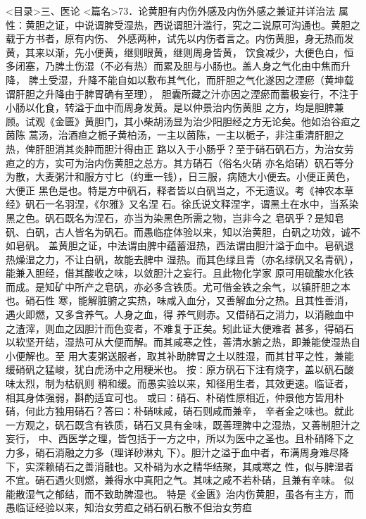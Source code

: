 \documentclass[a4paper,12pt,UTF8,twoside]{ctexbook}
\begin{document}
<目录>三、医论
<篇名>73．论黄胆有内伤外感及内伤外感之兼证并详治法
属性：黄胆之证，中说谓脾受湿热，西说谓胆汁滥行，究之二说原可沟通也。黄胆之载于方书者，原有内伤、 
外感两种，试先以内伤者言之。内伤黄胆，身无热而发黄，其来以渐，先小便黄，继则眼黄，继则周身皆黄， 
饮食减少，大便色白，恒多闭塞，乃脾土伤湿（不必有热）而累及胆与小肠也。盖人身之气化由中焦而升降， 
脾土受湿，升降不能自如以敷布其气化，而肝胆之气化遂因之湮瘀（黄坤载谓肝胆之升降由于脾胃确有至理）， 
胆囊所藏之汁亦因之湮瘀而蓄极妄行，不注于小肠以化食，转溢于血中而周身发黄。是以仲景治内伤黄胆 
之方，均是胆脾兼顾。试观《金匮》黄胆门，其小柴胡汤显为治少阳胆经之方无论矣。他如治谷疸之茵陈 
蒿汤，治酒疸之栀子黄柏汤，一主以茵陈，一主以栀子，非注重清肝胆之热，俾肝胆消其炎肿而胆汁得由正 
路以入于小肠乎？至于硝石矾石方，为治女劳疸之的方，实可为治内伤黄胆之总方。其方硝石（俗名火硝 
亦名焰硝）矾石等分为散，大麦粥汁和服方寸匕（约重一钱），日三服，病随大小便去。小便正黄色，大便正 
黑色是也。特是方中矾石，释者皆以白矾当之，不无遗议。考《神农本草经》矾石一名羽涅，《尔雅》又名涅 
石。徐氏说文释涅字，谓黑土在水中，当系染黑之色。矾石既名为涅石，亦当为染黑色所需之物，岂非今之 
皂矾乎？是知皂矾、白矾，古人皆名为矾石。而愚临症体验以来，知以治黄胆，白矾之功效，诚不如皂矾。 
盖黄胆之证，中法谓由脾中蕴蓄湿热，西法谓由胆汁溢于血中。皂矾退热燥湿之力，不让白矾，故能去脾中 
湿热。而其色绿且青（亦名绿矾又名青矾），能兼入胆经，借其酸收之味，以敛胆汁之妄行。且此物化学家 
原可用硫酸水化铁而成。是知矿中所产之皂矾，亦必多含铁质。尤可借金铁之余气，以镇肝胆之本也。硝石性 
寒，能解脏腑之实热，味咸入血分，又善解血分之热。且其性善消，遇火即燃，又多含养气。人身之血，得 
养气则赤。又借硝石之消力，以消融血中之渣滓，则血之因胆汁而色变者，不难复于正矣。矧此证大便难者 
甚多，得硝石以软坚开结，湿热可从大便而解。而其咸寒之性，善清水腑之热，即兼能使湿热自小便解也。至 
用大麦粥送服者，取其补助脾胃之土以胜湿，而其甘平之性，兼能缓硝矾之猛峻，犹白虎汤中之用粳米也。 
按∶原方矾石下注有烧字，盖以矾石酸味太烈，制为枯矾则 
稍和缓。而愚实验以来，知径用生者，其效更速。临证者，相其身体强弱，斟酌适宜可也。 
或曰∶硝石、朴硝性原相近，仲景他方皆用朴硝，何此方独用硝石？答曰∶朴硝味咸，硝石则咸而兼辛， 
辛者金之味也。就此一方观之，矾石既含有铁质，硝石又具有金味，既善理脾中之湿热，又善制胆汁之妄行， 
中、西医学之理，皆包括于一方之中，所以为医中之圣也。且朴硝降下之力多，硝石消融之力多（理详砂淋丸 
下）。胆汁之溢于血中者，布满周身难尽降下，实深赖硝石之善消融也。又朴硝为水之精华结聚，其咸寒之 
性，似与脾湿者不宜。硝石遇火则燃，兼得水中真阳之气。其味之咸不若朴硝，且兼有辛味。 
似能散湿气之郁结，而不致助脾湿也。 
特是《金匮》治内伤黄胆，虽各有主方，而愚临证经验以来，知治女劳疸之硝石矾石散不但治女劳疸 
\end{document}
